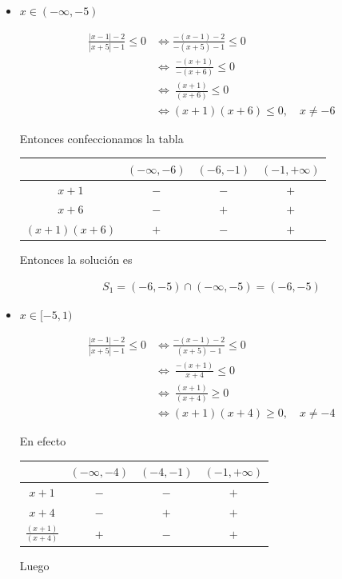 \documentclass[12pt]{book}
\begin{document}
\begin{itemize}
    \item $x \in (-\infty,-5)$

    \begin{align*}
        \frac{|x-1|-2}{|x+5|-1} \leq 0  &\Longleftrightarrow \frac{-(x-1)-2}{-(x+5)-1} \leq 0 \ \\ &\Longleftrightarrow \ \frac{-(x+1)}{-(x+6)} \leq 0 \\
        &\Longleftrightarrow \ \frac{(x+1)}{(x+6)} \leq 0 \\
        &\Longleftrightarrow(x+1)(x+6)\leq 0, \quad x \neq -6
    \end{align*}

Entonces confeccionamos la tabla

 \begin{center}
\begin{tabular}{|c|c|c|c|}
\hline
   & $(-\infty,-6) $  & $(-6,-1)$ & $(-1,+\infty)$ \\
   \hline
   $x+1$ & $-$ &$-$ &  $+$ \\ \hline
   $x+6$ & $-$ & $+$ & $+$ \\ \hline \hline
\rule{0pt}{0pt} $\displaystyle (x+1)(x+6)$ & $+$ & $-$ & $+$ \\
   \hline
\end{tabular}
\end{center}
Entonces la solución es

\begin{align*}
    S_1 = (-6,-5) \cap  (-\infty,-5) =(-6,-5)
\end{align*}
\item $x \in [-5,1)$

\begin{align*}
         \frac{|x-1|-2}{|x+5|-1} \leq 0  &\Longleftrightarrow  \frac{-(x-1)-2}{(x+5)-1} \leq 0 \\ \ &\Longleftrightarrow \ \frac{-(x+1)}{x+4} \leq 0 \\
        &\Longleftrightarrow \ \frac{(x+1)}{(x+4)} \geq 0 \\
         &\Longleftrightarrow (x+1)(x+4) \geq 0, \quad x \neq -4
\end{align*}

En efecto

\begin{center}
\begin{tabular}{|c|c|c|c|}
\hline
   & $(-\infty,-4) $  & $(-4,-1)$ & $(-1,+\infty)$ \\
   \hline
   $x+1$ & $-$ &$-$ &  $+$ \\ \hline
   $x+4$ & $-$ & $+$ & $+$ \\ \hline \hline
\rule{0pt}{0pt} $\displaystyle \frac{(x+1)}{(x+4)}$ & $+$ & $-$ & $+$ \\
   \hline
\end{tabular}
\end{center}
Luego


\end{itemize}
\end{document}
